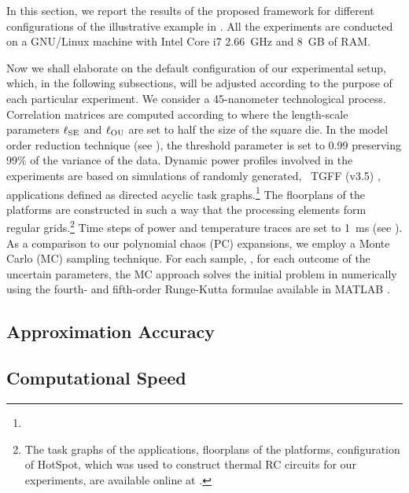 
In this section, we report the results of the proposed framework for different configurations of the illustrative example in .
All the experiments are conducted on a GNU/Linux machine with Intel Core i7 2.66~GHz and 8~GB of RAM.

Now we shall elaborate on the default configuration of our experimental setup, which, in the following subsections, will be adjusted according to the purpose of each particular experiment.
We consider a 45-nanometer technological process.
Correlation matrices are computed according to  where the length-scale parameters $\ell_{\text{SE}}$ and $\ell_{\text{OU}}$ are set to half the size of the square die.
In the model order reduction technique (see ), the threshold parameter is set to 0.99 preserving 99\% of the variance of the data.
Dynamic power profiles involved in the experiments are based on simulations of randomly generated, \via\ TGFF (v3.5) \cite{dick1998}, applications defined as directed acyclic task graphs.\footnote{}
The floorplans of the platforms are constructed in such a way that the processing elements form regular grids.\footnote{The task graphs of the applications, floorplans of the platforms, configuration of HotSpot, which was used to construct thermal RC circuits for our experiments, are available online at \cite{sources}.}
Time steps of power and temperature traces are set to 1~ms (see ).
As a comparison to our polynomial chaos (PC) expansions, we employ a Monte Carlo (MC) sampling technique.
For each sample, \ie, for each outcome of the uncertain parameters, the MC approach solves the initial problem in  numerically using the fourth- and fifth-order Runge-Kutta formulae \cite{press2007} available in MATLAB \cite{matlab}.

\subsection{Approximation Accuracy} 


\subsection{Computational Speed} 

